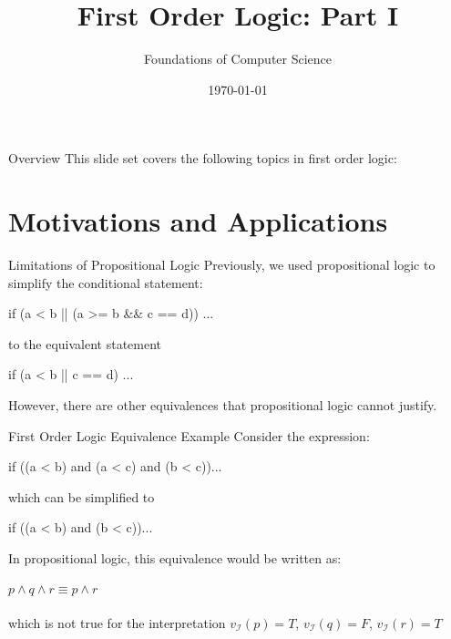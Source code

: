\documentclass[style=sailor,size=12pt]{powerdot}
\title{First Order Logic: Part I}
\author{Foundations of Computer Science}
\date{\today}
\begin{document}
\maketitle
\begin{slide}[toc=,bm=]{Overview}
This slide set covers the following topics in first order logic:

\vspace{5mm}
\tableofcontents[content=sections]
\end{slide}

\section[slide=true]{Motivations and Applications}
\begin{wideslide}[bm=,toc=]{Limitations of Propositional Logic}
Previously, we used propositional logic to simplify the conditional statement:
\begin{program}
if (a < b || (a >= b \&\& c == d)) ...
\end{program}
\pause 
to the equivalent statement
\vspace{-1em}
\begin{program}
if (a < b || c == d) ...
\end{program}
\pause
However, there are other equivalences that propositional logic cannot justify.
\end{wideslide}

\begin{wideslide}[bm=,toc=]{First Order Logic Equivalence Example}
Consider the expression:
\begin{program}
if ((a < b) and (a < c) and (b < c))...
\end{program}
\pause
which can be simplified to
\vspace{-1em}
\begin{program}
if ((a < b) and (b < c))...
\end{program}
\vspace{-1em}
\pause
In propositional logic, this equivalence would be written as:\\~\\
$p \land q \land r \equiv p \land r$\\~\\
\pause
which is not true for the interpretation $v_{\mathcal{I}}(p) = T$,
   $v_{\mathcal{I}}(q) = F$, $v_{\mathcal{I}}(r) = T$
\end{wideslide}
\end{document}
